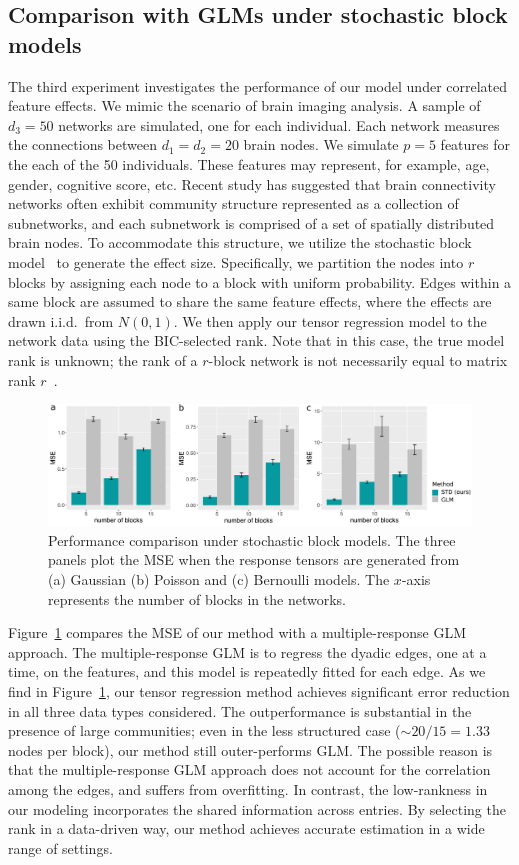 \documentclass[12pt]{article}
\theoremstyle{definition}
\theoremstyle{definition}
\begin{document}
\subsection{Comparison with GLMs under stochastic block models}
The third experiment investigates the performance of our model under correlated feature effects. We mimic the scenario of brain imaging analysis. A sample of $d_3=50$ networks are simulated, one for each individual. Each network measures the connections between $d_1=d_2=20$ brain nodes. We simulate $p=5$ features for the each of the 50 individuals. These features may represent, for example, age, gender, cognitive score, etc. Recent study has suggested that brain connectivity networks often exhibit community structure represented as a collection of subnetworks, and each subnetwork is comprised of a set of spatially distributed brain nodes. To accommodate this structure, we utilize the stochastic block model~\citep{abbe2017community} to generate the effect size. Specifically, we partition the nodes into $r$ blocks by assigning each node to a block with uniform probability. Edges within a same block are assumed to share the same feature effects, where the effects are drawn i.i.d.\ from $N(0,1)$. We then apply our tensor regression model to the network data using the BIC-selected rank. Note that in this case, the true model rank is unknown; the rank of a $r$-block network is not necessarily equal to matrix rank $r$~\citep{zeng2019multiway}. 

\begin{figure}[ht]
\centering
\includegraphics[width=16cm]{compare_GLM.pdf}
\caption{Performance comparison under stochastic block models. The three panels plot the MSE when the response tensors are generated from (a) Gaussian (b) Poisson and (c) Bernoulli models. The $x$-axis represents the number of blocks in the networks. }\label{fig:glm}
\end{figure}


Figure~\ref{fig:glm} compares the MSE of our method with a multiple-response GLM approach. The multiple-response GLM is to regress the dyadic edges, one at a time, on the features, and this model is repeatedly fitted for each edge. As we find in Figure~\ref{fig:glm}, our tensor regression method achieves significant error reduction in all three data types considered. The outperformance is substantial in the presence of large communities; even in the less structured case ($\sim 20/15=1.33$ nodes per block), our method still outer-performs GLM. The possible reason is that the multiple-response GLM approach does not account for the correlation among the edges, and suffers from overfitting. In contrast, the low-rankness in our modeling incorporates the shared information across entries. By selecting the rank in a data-driven way, our method achieves accurate estimation in a wide range of settings. 
\end{document}
